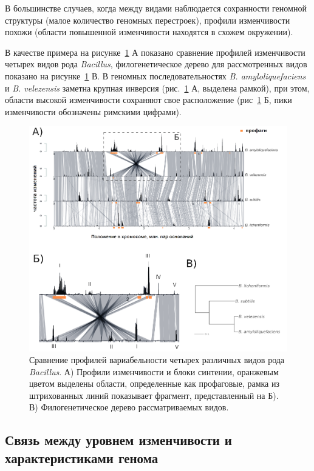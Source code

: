 В большинстве случаев, когда между видами наблюдается сохранности геномной структуры (малое количество геномных перестроек), профили изменчивости похожи (области повышенной изменчивости находятся в схожем окружении). 

В качестве примера на рисунке~\ref{img:species_complex_bacillus} А показано сравнение профилей изменчивости четырех видов рода \textit{Bacillus}, филогенетическое дерево для рассмотренных видов показано на рисунке~\ref{img:species_complex_bacillus} В. В геномных последовательностях \textit{B. amyloliquefaciens} и \textit{B. velezensis} заметна крупная инверсия (рис.~\ref{img:species_complex_bacillus} А, выделена рамкой), при этом, области высокой изменчивости сохраняют свое расположение (рис~\ref{img:species_complex_bacillus} Б, пики изменчивости обозначены римскими цифрами). 

\begin{figure}[!ht] 
  \center
    \includegraphics[width=\textwidth]{Dissertation/images/complexity/bacillus_compare_v3.png}
  \caption{Сравнение профилей вариабельности четырех различных видов рода \textit{Bacillus}. А) Профили изменчивости и блоки синтении, оранжевым цветом выделены области, определенные как профаговые, рамка из штрихованных линий показывает фрагмент, представленный на Б). В) Филогенетическое дерево рассматриваемых видов.}
  \label{img:species_complex_bacillus} 
\end{figure}

\subsection*{Связь между уровнем изменчивости и характеристиками генома}\label{chaptComplexWithSMTH}

